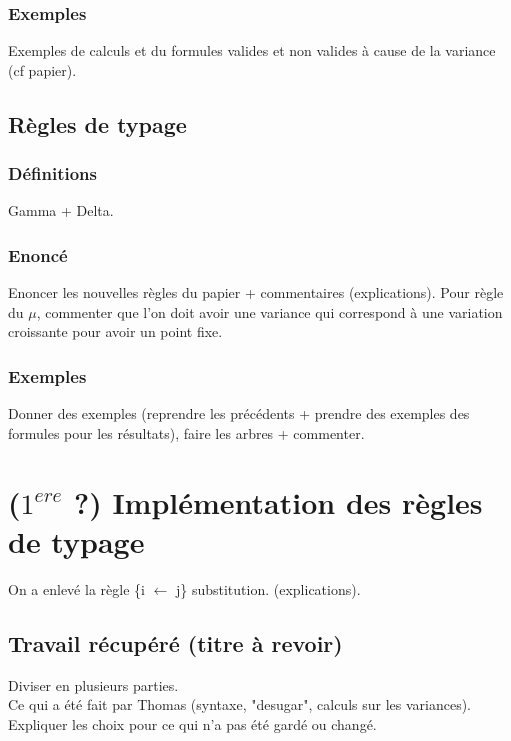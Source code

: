 \documentclass[11pt,a4paper]{article}
\theoremstyle{plain}
\theoremstyle{remark}
\theoremstyle{definition}
\begin{document}
\subsubsection{Exemples}

Exemples de calculs et du formules valides et non valides à cause de la variance (cf papier).

\subsection{Règles de typage}

\subsubsection{Définitions}

Gamma + Delta.

\subsubsection{Enoncé}

Enoncer les nouvelles règles du papier + commentaires (explications). \color{red} Pour règle du $\mu$, commenter que l'on doit avoir une variance qui correspond à une variation croissante pour avoir un point fixe. \color{black}

\subsubsection{Exemples}

Donner des exemples (reprendre les précédents + prendre des exemples des formules pour les résultats), faire les arbres + commenter.

\section{($1^{ere}$ ?) Implémentation des règles de typage}

On a enlevé la règle \{i $\longleftarrow$ j\} substitution. (explications).


\subsection{Travail récupéré (titre à revoir)}

Diviser en plusieurs parties.
\\
Ce qui a été fait par Thomas (syntaxe, "desugar", calculs sur les variances). 
\\
Expliquer les choix pour ce qui n'a pas été gardé ou changé. 
\end{document}
